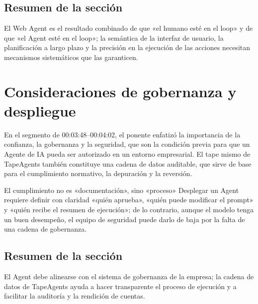 \documentclass[a4paper]{article}
\begin{document}
\subsection{Resumen de la sección}
El Web Agent es el resultado combinado de que «el humano esté en el loop» y de que «el Agent esté en el loop»; la semántica de la interfaz de usuario, la planificación a largo plazo y la precisión en la ejecución de las acciones necesitan mecanismos sistemáticos que las garanticen.

\section{Consideraciones de gobernanza y despliegue}
En el segmento de 00:03:48--00:04:02, el ponente enfatizó la importancia de la confianza, la gobernanza y la seguridad, que son la condición previa para que un Agente de IA pueda ser autorizado en un entorno empresarial. El tape mismo de TapeAgents también constituye una cadena de datos auditable, que sirve de base para el cumplimiento normativo, la depuración y la reversión.

\begin{warningbox}{El cumplimiento no es «documentación», sino «proceso»}
Desplegar un Agent requiere definir con claridad «quién aprueba», «quién puede modificar el prompt» y «quién recibe el resumen de ejecución»; de lo contrario, aunque el modelo tenga un buen desempeño, el equipo de seguridad puede darlo de baja por la falta de una cadena de gobernanza.
\end{warningbox}

\subsection{Resumen de la sección}
El Agent debe alinearse con el sistema de gobernanza de la empresa; la cadena de datos de TapeAgents ayuda a hacer transparente el proceso de ejecución y a facilitar la auditoría y la rendición de cuentas.
\end{document}
